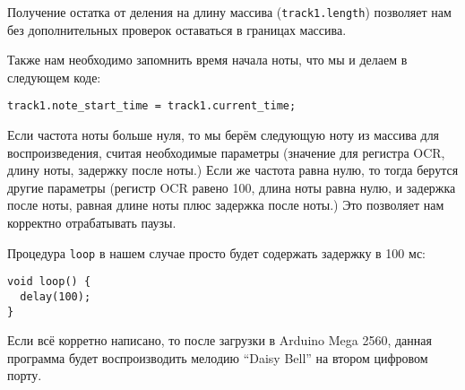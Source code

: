 \documentclass[../sparc.tex]{subfiles}
\begin{document}
Получение остатка от деления на длину массива (\texttt{track1.length})
позволяет нам без дополнительных проверок оставаться в границах массива.

Также нам необходимо запомнить время начала ноты, что мы и делаем в следующем
коде:

\begin{verbatim}
track1.note_start_time = track1.current_time;
\end{verbatim}

Если частота ноты больше нуля, то мы берём следующую ноту из массива для
воспроизведения, считая необходимые параметры (значение для регистра OCR, длину
ноты, задержку после ноты.)  Если же частота равна нулю, то тогда берутся другие
параметры (регистр OCR равено 100, длина ноты равна нулю, и задержка после ноты,
равная длине ноты плюс задержка после ноты.)  Это позволяет нам корректно
отрабатывать паузы.

Процедура \texttt{loop} в нашем случае просто будет содержать задержку
в 100 мс:

\begin{verbatim}
void loop() {
  delay(100);
}
\end{verbatim}

Если всё корретно написано, то после загрузки в Arduino Mega 2560, данная
программа будет воспроизводить мелодию ``Daisy Bell'' на втором цифровом порту.
\end{document}
